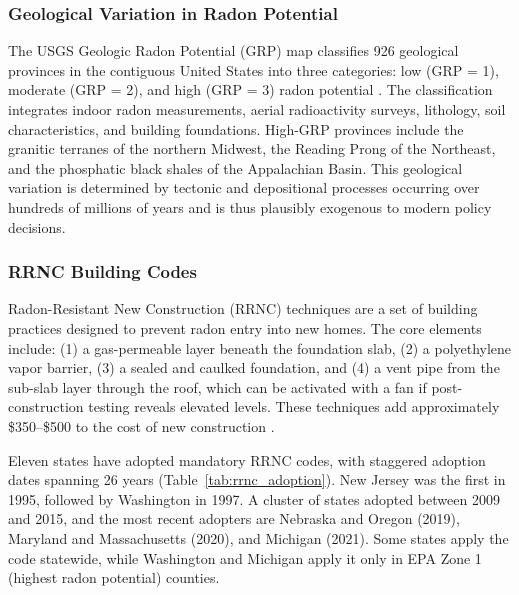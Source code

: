 \documentclass[12pt]{article}
\begin{document}
\subsubsection*{Geological Variation in Radon Potential} The USGS Geologic Radon Potential (GRP) map classifies 926 geological provinces in the contiguous United States into three categories: low (GRP = 1), moderate (GRP = 2), and high (GRP = 3) radon potential \citep{gundersen1993geologic}. The classification integrates indoor radon measurements, aerial radioactivity surveys, lithology, soil characteristics, and building foundations. High-GRP provinces include the granitic terranes of the northern Midwest, the Reading Prong of the Northeast, and the phosphatic black shales of the Appalachian Basin. This geological variation is determined by tectonic and depositional processes occurring over hundreds of millions of years and is thus plausibly exogenous to modern policy decisions.

\subsubsection*{RRNC Building Codes} Radon-Resistant New Construction (RRNC) techniques are a set of building practices designed to prevent radon entry into new homes. The core elements include: (1) a gas-permeable layer beneath the foundation slab, (2) a polyethylene vapor barrier, (3) a sealed and caulked foundation, and (4) a vent pipe from the sub-slab layer through the roof, which can be activated with a fan if post-construction testing reveals elevated levels. These techniques add approximately \$350--\$500 to the cost of new construction \citep{epa2001building}.

Eleven states have adopted mandatory RRNC codes, with staggered adoption dates spanning 26 years (Table~\ref{tab:rrnc_adoption}). New Jersey was the first in 1995, followed by Washington in 1997. A cluster of states adopted between 2009 and 2015, and the most recent adopters are Nebraska and Oregon (2019), Maryland and Massachusetts (2020), and Michigan (2021). Some states apply the code statewide, while Washington and Michigan apply it only in EPA Zone 1 (highest radon potential) counties.
\end{document}
